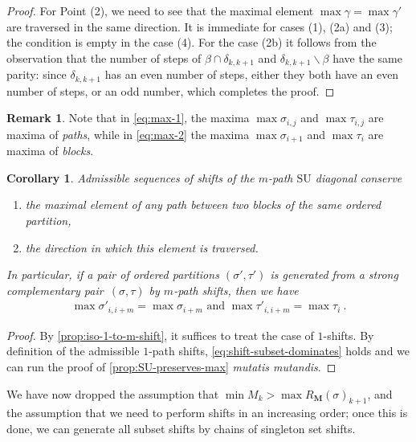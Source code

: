 \documentclass{amsart}
\newtheorem{corollary}[theorem]{Corollary}
\theoremstyle{definition}
\newtheorem{remark}[theorem]{Remark}
\newcommand{\ssm}{\smallsetminus} %
\newcommand{\SU}{\mathrm{SU}}
\begin{document}
\begin{proof}
For Point (2), we need to see that the maximal element $\max \gamma = \max \gamma'$ are traversed in the same direction.
It is immediate for cases (1), (2a) and (3); the condition is empty in the case (4).
For the case (2b) it follows from the observation that the number of steps of $\beta \cap \delta_{k,k+1}$ and $\delta_{k,k+1} \ssm \beta$ have the same parity: since $\delta_{k,k+1}$ has an even number of steps, either they both have an even number of steps, or an odd number, which completes the proof.
\end{proof}

\begin{remark}
    Note that in \cref{eq:max-1}, the maxima $\max \sigma_{i,j}$ and $\max \tau_{i,j}$ are maxima of \emph{paths}, while in \cref{eq:max-2} the maxima $\max \sigma_{i+1}$ and $\max \tau_{i}$ are maxima of \emph{blocks}.
\end{remark}

\begin{corollary} 
\label{cor:SU-shift-preserves-max}
Admissible sequences of shifts of the $m$-path $\SU$ diagonal conserve 
\begin{enumerate}
    \item the maximal element of any path between two blocks of the same ordered partition,
    \item the direction in which this element is traversed. 
\end{enumerate}
In particular, if a pair of ordered partitions $(\sigma',\tau')$ is generated from a strong complementary pair~$(\sigma,\tau)$ by $m$-path shifts, then we have
\begin{align}
    \label{eq:max-3}
    \max \sigma'_{i,i+m} = \max \sigma_{i+m} \text{ and } \max \tau'_{i,i+m} = \max \tau_{i} \ .
\end{align}
\end{corollary}

\begin{proof}
    By \cref{prop:iso-1-to-m-shift}, it suffices to treat the case of $1$-shifts. 
    By definition of the admissible $1$-path shifts, \cref{eq:shift-subset-dominates} holds and we can run the proof of \cref{prop:SU-preserves-max} \emph{mutatis mutandis}.
\end{proof}

We have now dropped the assumption that $\min M_k > \max R_{\mathbf{M}}(\sigma)_{k+1}$, and the assumption that we need to perform shifts in an increasing order; once this is done, we can generate all subset shifts by chains of singleton set shifts.
\end{document}
